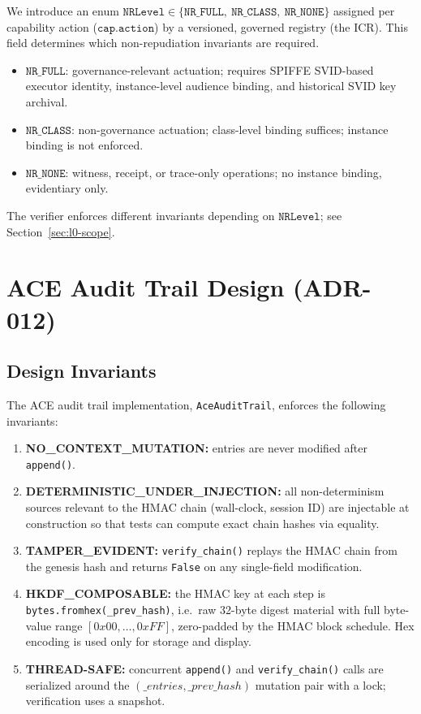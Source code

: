 \documentclass[11pt]{article}
\begin{document}
We introduce an enum \(\texttt{NRLevel} \in
\{\texttt{NR\_FULL},\ \texttt{NR\_CLASS},\ \texttt{NR\_NONE}\}\)
assigned per capability action (\(\texttt{cap.action}\)) by a versioned,
governed registry (the ICR). This field determines which non-repudiation
invariants are required.

\begin{itemize}
  \item \(\texttt{NR\_FULL}\): governance-relevant actuation; requires
        SPIFFE SVID-based executor identity, instance-level audience
        binding, and historical SVID key archival.
  \item \(\texttt{NR\_CLASS}\): non-governance actuation; class-level
        binding suffices; instance binding is not enforced.
  \item \(\texttt{NR\_NONE}\): witness, receipt, or trace-only operations;
        no instance binding, evidentiary only.
\end{itemize}

The verifier enforces different invariants depending on \(\texttt{NRLevel}\);
see Section~\ref{sec:l0-scope}.

\section{ACE Audit Trail Design (ADR-012)}

\subsection{Design Invariants}

The ACE audit trail implementation, \texttt{AceAuditTrail}, enforces
the following invariants:

\begin{enumerate}[label=(I\arabic*)]
  \item \textbf{NO\_CONTEXT\_MUTATION:} entries are never modified after
        \texttt{append()}.
  \item \textbf{DETERMINISTIC\_UNDER\_INJECTION:} all non-determinism
        sources relevant to the HMAC chain (wall-clock, session ID)
        are injectable at construction so that tests can compute exact
        chain hashes via equality.
  \item \textbf{TAMPER\_EVIDENT:} \texttt{verify\_chain()} replays the
        HMAC chain from the genesis hash and returns \texttt{False} on
        any single-field modification.
  \item \textbf{HKDF\_COMPOSABLE:} the HMAC key at each step is
        \texttt{bytes.fromhex(\_prev\_hash)}, i.e.\ raw 32-byte digest
        material with full byte-value range \([0x00,\dots,0xFF]\),
        zero-padded by the HMAC block schedule. Hex encoding is used
        only for storage and display.
  \item \textbf{THREAD-SAFE:} concurrent \texttt{append()} and
        \texttt{verify\_chain()} calls are serialized around the
        \((\_entries, \_prev\_hash)\) mutation pair with a lock;
        verification uses a snapshot.
\end{enumerate}
\end{document}
